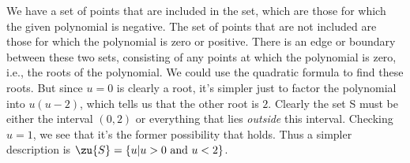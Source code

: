 We have a set of points that are included in the set, which are those
for which the given polynomial is negative. The set of points that are
not included are those for which the polynomial is zero or positive.
There is an edge or boundary between these two sets, consisting of
any points at which the polynomial is zero, i.e., the roots of the polynomial.
We could use the quadratic formula to find these roots. But since
$u=0$ is clearly a root, it's simpler just to factor the polynomial
into $u(u-2)$, which tells us that the other root is $2$.
Clearly the set S must be either the interval $(0,2)$ or
everything that lies \emph{outside} this interval. Checking
$u=1$, we see that it's the former possibility that holds. Thus
a simpler description is $\zu{S}=\{u|u>0\ \text{and}\ u<2\}$.
